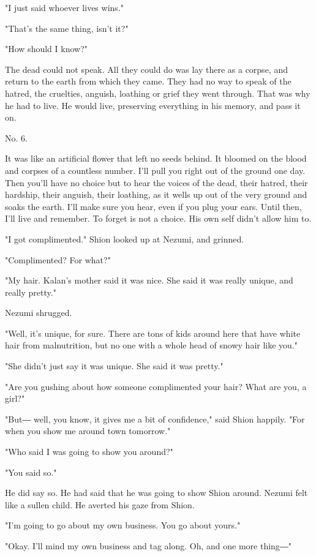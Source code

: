 "I just said whoever lives wins."

"That's the same thing, isn't it?"

"How should I know?"

The dead could not speak. All they could do was lay there as a corpse,
and return to the earth from which they came. They had no way to speak
of the hatred, the cruelties, anguish, loathing or grief they went
through. That was why he had to live. He would live, preserving
everything in his memory, and pass it on.

No. 6.~

It was like an artificial flower that left no seeds behind. It bloomed
on the blood and corpses of a countless number. I'll pull you right out
of the ground one day. Then you'll have no choice but to hear the voices
of the dead, their hatred, their hardship, their anguish, their
loathing, as it wells up out of the very ground and soaks the earth.
I'll make sure you hear, even if you plug your ears. Until then, I'll
live and remember. To forget is not a choice. His own self didn't allow
him to.

"I got complimented." Shion looked up at Nezumi, and grinned.

"Complimented? For what?"

"My hair. Kalan's mother said it was nice. She said it was really
unique, and really pretty."

Nezumi shrugged.

"Well, it's unique, for sure. There are tons of kids around here that
have white hair from malnutrition, but no one with a whole head of snowy
hair like you."

"She didn't just say it was unique. She said it was pretty."

"Are you gushing about how someone complimented your hair? What are you,
a girl?"

"But― well, you know, it gives me a bit of confidence," said Shion
happily. "For when you show me around town tomorrow."

"Who said I was going to show you around?"

"You said so."

He did say so. He had said that he was going to show Shion around.
Nezumi felt like a sullen child. He averted his gaze from Shion.

"I'm going to go about my own business. You go about yours."

"Okay. I'll mind my own business and tag along. Oh, and one more thing―"

